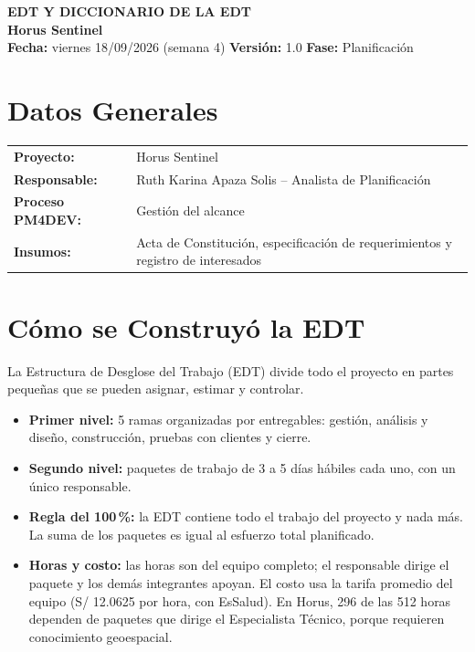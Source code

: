 \documentclass[11pt,a4paper]{article}
\begin{document}
\begin{center}
    {\Large \textbf{\textcolor{AzulUNA}{EDT Y DICCIONARIO DE LA EDT}}}\\[3pt]
    {\normalsize \textbf{Horus Sentinel}}\\[4pt]
    \footnotesize \textbf{Fecha:} viernes 18/09/2026 (semana 4) \quad \textbar\quad \textbf{Versión:} 1.0 \quad \textbar\quad \textbf{Fase:} Planificación
\end{center}

\vspace{0.1cm}

\section{Datos Generales}
\noindent\begin{tabularx}{\textwidth}{@{}P{4.2cm} L@{}}
\toprule
\textbf{Proyecto:} & Horus Sentinel \\
\textbf{Responsable:} & Ruth Karina Apaza Solis -- Analista de Planificación \\
\textbf{Proceso PM4DEV:} & Gestión del alcance \\
\textbf{Insumos:} & Acta de Constitución, especificación de requerimientos y registro de interesados \\
\bottomrule
\end{tabularx}

\section{Cómo se Construyó la EDT}
La Estructura de Desglose del Trabajo (EDT) divide todo el proyecto en partes pequeñas que se pueden asignar, estimar y controlar.
\begin{itemize}[leftmargin=*]
    \item \textbf{Primer nivel:} 5 ramas organizadas por entregables: gestión, análisis y diseño, construcción, pruebas con clientes y cierre.
    \item \textbf{Segundo nivel:} paquetes de trabajo de 3 a 5 días hábiles cada uno, con un único responsable.
    \item \textbf{Regla del 100\,\%:} la EDT contiene todo el trabajo del proyecto y nada más. La suma de los paquetes es igual al esfuerzo total planificado.
    \item \textbf{Horas y costo:} las horas son del equipo completo; el responsable dirige el paquete y los demás integrantes apoyan. El costo usa la tarifa promedio del equipo (S/ 12.0625 por hora, con EsSalud). En Horus, 296 de las 512 horas dependen de paquetes que dirige el Especialista Técnico, porque requieren conocimiento geoespacial.
\end{itemize}
\end{document}
